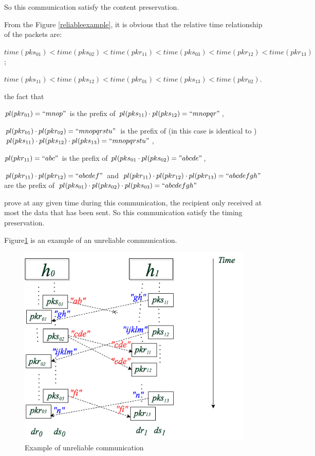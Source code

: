 \documentclass[12pt,oneside]{book}
\begin{document}
So this communication satisfy the content preservation. 

From the Figure \ref{reliableexample}, it is obvious that the relative time relationship of the packets are: 

$time(pks_{01}) < time(pks_{02}) < time(pkr_{11})< time(pks_{03}) < time(pkr_{12}) < time(pkr_{13}) $;

$time(pks_{11}) < time(pks_{12}) < time(pkr_{01})< time(pks_{13}) < time(pkr_{02})$. 

the fact that

$pl(pkr_{01}) = ``mnop"$ is the prefix of $pl(pks_{11}) \cdot  pl(pks_{12}) = ``mnopqr"$,

$pl(pkr_{01}) \cdot pl(pkr_{02})=``mnopqrstu"$ is the prefix of (in this case is identical to ) $pl(pks_{11}) \cdot pl(pks_{12}) \cdot pl(pks_{13}) = ``mnopqrstu" $,  

$pl(pkr_{11})=``abc"$ is the prefix of $pl(pks_{01} \cdot pl(pks_{02}) = "abcde"$,  

$pl(pkr_{11}) \cdot pl(pkr_{12})= ``abcdef"$ and  $pl(pkr_{11}) \cdot pl(pkr_{12}) \cdot pl(pkr_{13}) = ``abcdefgh"$ are  the prefix of  $pl(pks_{01}) \cdot pl(pks_{02}) \cdot pl(pks_{03})= ``abcdefgh"$

prove at any given time during this communication, the recipient only received at most the data that has been sent. So this communication satisfy the timing preservation. 


Figure\ref{unreliableexample} is an example of an unreliable communication. 

\begin{figure}[H]
\centerline{\includegraphics[scale=0.5]{Figures/unreliableexample}}
\caption{Example of unreliable communication}
\label{unreliableexample}
\end{figure}
\end{document}
